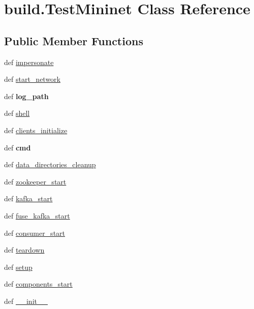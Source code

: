 \hypertarget{classbuild_1_1TestMininet}{\section{build.\-Test\-Mininet \-Class \-Reference}
\label{classbuild_1_1TestMininet}
}
\subsection*{\-Public \-Member \-Functions}
\begin{DoxyCompactItemize}
\item 
def \hyperlink{classbuild_1_1TestMininet_a8e289e361dade20ec1ad1c4e21cadd1a}{impersonate}
\item 
def \hyperlink{classbuild_1_1TestMininet_ae28256d061cb92ca35a47abfa3352c6f}{start\-\_\-network}
\item 
\hypertarget{classbuild_1_1TestMininet_a8523c1dd0a6bb4fbd65f52c7a819924e}{def {\bfseries log\-\_\-path}}\label{classbuild_1_1TestMininet_a8523c1dd0a6bb4fbd65f52c7a819924e}

\item 
def \hyperlink{classbuild_1_1TestMininet_a7ae01ec8dc3e0a8d7768884a56dd2e96}{shell}
\item 
def \hyperlink{classbuild_1_1TestMininet_aa222c3691d93c73ac4e047e163fa791c}{clients\-\_\-initialize}
\item 
\hypertarget{classbuild_1_1TestMininet_aa13c4ec02d058002da3c771aff0114bd}{def {\bfseries cmd}}\label{classbuild_1_1TestMininet_aa13c4ec02d058002da3c771aff0114bd}

\item 
def \hyperlink{classbuild_1_1TestMininet_a83b14b12435ff9ffa7332fc2b8e197ae}{data\-\_\-directories\-\_\-cleanup}
\item 
def \hyperlink{classbuild_1_1TestMininet_aa3eddff2c619b28456be8a68dfe0c8cd}{zookeeper\-\_\-start}
\item 
def \hyperlink{classbuild_1_1TestMininet_abea6fef76c2d624f8ab4f9834fa30825}{kafka\-\_\-start}
\item 
def \hyperlink{classbuild_1_1TestMininet_a731ba3e4c942e40ebf114bfd1b01a287}{fuse\-\_\-kafka\-\_\-start}
\item 
def \hyperlink{classbuild_1_1TestMininet_a8239e151542b50fc2152cfd431a71095}{consumer\-\_\-start}
\item 
def \hyperlink{classbuild_1_1TestMininet_ab81a1d9ca2fcdee77ebcbf243fea4eb5}{teardown}
\item 
def \hyperlink{classbuild_1_1TestMininet_a9efe3ef9358f1f2c6078c415fe50b2df}{setup}
\item 
def \hyperlink{classbuild_1_1TestMininet_a595237e962e2bc7b55329097775624c8}{components\-\_\-start}
\item 
def \hyperlink{classbuild_1_1TestMininet_abab12f1966a20b7aacd47dcad5b978b1}{\-\_\-\-\_\-init\-\_\-\-\_\-}
\end{DoxyCompactItemize}
